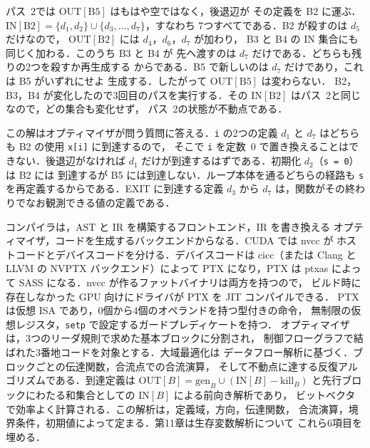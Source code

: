 \documentclass[../main.tex]{subfiles}
\begin{document}
\begin{example}
  \label{ex:l10-pass2}
  パス~2では $\mathrm{OUT}[\mathrm{B5}]$ はもはや空ではなく，後退辺が
  その定義を B2 に運ぶ．
  $\mathrm{IN}[\mathrm{B2}]=\{d_1,d_2\}\cup\{d_3,\dots,d_7\}$，すなわち
  7つすべてである．B2 が殺すのは $d_5$ だけなので，
  $\mathrm{OUT}[\mathrm{B2}]$ には $d_4$，$d_6$，$d_7$ が加わり，
  B3 と B4 の $\mathrm{IN}$ 集合にも同じく加わる．このうち B3 と B4 が
  先へ渡すのは $d_7$ だけである．どちらも残りの2つを殺すか再生成する
  からである．B5 で新しいのは $d_7$ だけであり，これは B5 がいずれにせよ
  生成する．したがって $\mathrm{OUT}[\mathrm{B5}]$ は変わらない．
  B2，B3，B4 が変化したので3回目のパスを実行する．その
  $\mathrm{IN}[\mathrm{B2}]$ はパス~2と同じなので，どの集合も変化せず，
  パス~2の状態が不動点である．
\end{example}

この解はオプティマイザが問う質問に答える．\texttt{i} の2つの定義
$d_1$ と $d_7$ はどちらも B2 の使用 \texttt{x[i]} に到達するので，
そこで \texttt{i} を定数~0 で置き換えることはできない．後退辺がなければ
$d_1$ だけが到達するはずである．初期化 $d_2$（\texttt{s = 0}）は B2 には
到達するが B5 には到達しない．ループ本体を通るどちらの経路も
\texttt{s} を再定義するからである．EXIT に到達する定義 $d_3$ から
$d_7$ は，関数がその終わりでなお観測できる値の定義である．

\begin{keypoint}[章のまとめ]
  コンパイラは，AST と IR を構築するフロントエンド，IR を書き換える
  オプティマイザ，コードを生成するバックエンドからなる．CUDA では nvcc が
  ホストコードとデバイスコードを分ける．デバイスコードは cicc（または
  Clang と LLVM の NVPTX バックエンド）によって PTX になり，PTX は
  ptxas によって SASS になる．nvcc が作るファットバイナリは両方を持つので，
  ビルド時に存在しなかった GPU 向けにドライバが PTX を JIT コンパイルできる．
  PTX は仮想 ISA であり，0個から4個のオペランドを持つ型付きの命令，
  無制限の仮想レジスタ，\texttt{setp} で設定するガードプレディケートを持つ．
  オプティマイザは，3つのリーダ規則で求めた基本ブロックに分割され，
  制御フローグラフで結ばれた3番地コードを対象とする．大域最適化は
  データフロー解析に基づく．ブロックごとの伝達関数，合流点での合流演算，
  そして不動点に達する反復アルゴリズムである．到達定義は
  $\mathrm{OUT}[B]=\mathrm{gen}_B\cup(\mathrm{IN}[B]-\mathrm{kill}_B)$
  と先行ブロックにわたる和集合としての $\mathrm{IN}[B]$ による前向き解析であり，
  ビットベクタで効率よく計算される．この解析は，定義域，方向，伝達関数，
  合流演算，境界条件，初期値によって定まる．第11章は生存変数解析について
  これら6項目を埋める．
\end{keypoint}
\end{document}
